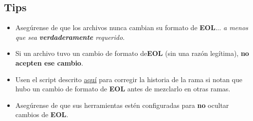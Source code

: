 \subsection{Tips}
\begin{itemize}
	\item Asegúrense de que los archivos nunca cambian su formato de {\bf EOL}... {\it a menos que sea {\bf verdaderamente} requerido}.
	\item Si un archivo tuvo un cambio de formato de{\bf EOL} (sin una razón legítima), {\bf no acepten ese cambio}.
	\item Usen el script descrito \hyperref[correct_eol_history]{aquí} para corregir la historia de la rama si notan que hubo un cambio
	de formato de {\bf EOL} antes de mezclarlo en otras ramas.
	\item Asegúrense de que sus herramientas estén configuradas para {\bf no} ocultar cambios de {\bf EOL}.
\end{itemize}
